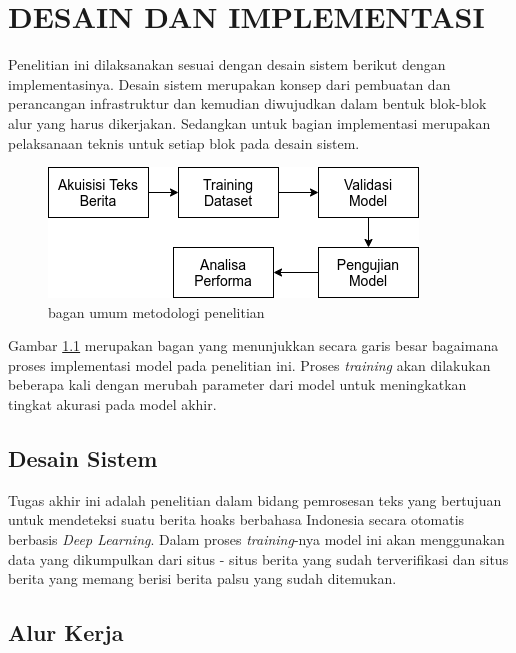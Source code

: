 \chapter{DESAIN DAN IMPLEMENTASI}
\label{chap:desainimplementasi}

Penelitian ini dilaksanakan sesuai dengan desain sistem berikut dengan implementasinya. Desain sistem merupakan konsep dari pembuatan dan perancangan infrastruktur dan kemudian diwujudkan dalam bentuk blok-blok alur yang harus dikerjakan. Sedangkan untuk bagian implementasi merupakan pelaksanaan teknis untuk setiap blok pada desain sistem.

\begin{figure}[h!]
  \begin{center}
    \includegraphics[width= 0.7\linewidth]{gambar/research_flow.png}
    \caption{bagan umum metodologi penelitian}
    \label{fig: base_method}
  \end{center}
\end{figure}

Gambar \ref{fig: base_method} merupakan bagan yang menunjukkan secara garis besar bagaimana proses implementasi model pada penelitian ini. Proses \textit{training} akan dilakukan beberapa kali dengan merubah parameter dari model untuk meningkatkan tingkat akurasi pada model akhir.

\section{Desain Sistem}

Tugas akhir ini adalah penelitian dalam bidang pemrosesan teks yang bertujuan untuk mendeteksi suatu berita hoaks berbahasa Indonesia secara otomatis berbasis \textit{Deep Learning}. Dalam proses \textit{training}-nya model ini akan menggunakan data yang dikumpulkan dari situs - situs berita yang sudah terverifikasi dan situs berita yang memang berisi berita palsu yang sudah ditemukan.


\section{Alur Kerja}

